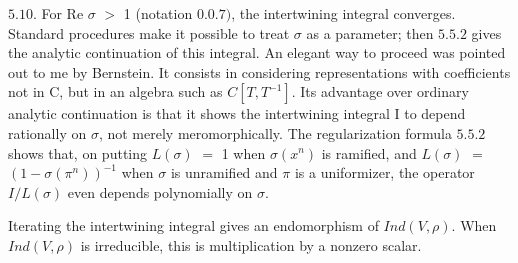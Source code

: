 \documentclass[10pt,a4paper]{article}
\begin{document}
\par $5.10$. For Re $\sigma{}$ $>$ 1 (notation $0.0.7)$, the intertwining integral converges. Standard procedures make it possible to treat $\sigma{}$ as a parameter; then $5.5.2$ gives the analytic continuation of this integral. An elegant way to proceed was pointed out to me by Bernstein. It consists in considering representations with coefficients not in C, but in an algebra such as $C[T,T^{-1}]$. Its advantage over ordinary analytic continuation is that it shows the intertwining integral I to depend rationally on $\sigma{}$, not merely meromorphically. The regularization formula $5.5.2$ shows that, on putting $L(\sigma{})$ $=$ 1 when $\sigma{}(x^n)$ is ramified, and $L(\sigma{})$ $=$ $(1-\sigma{}(\pi{}^n))^{-1}$ when $\sigma{}$ is unramified and $\pi{}$ is a uniformizer, the operator $I/L(\sigma{})$ even depends polynomially on $\sigma{}$.\par
\par Iterating the intertwining integral gives an endomorphism of $Ind(V,\rho{})$. When $Ind(V,\rho{})$ is irreducible, this is multiplication by a nonzero scalar.\par
\end{document}
